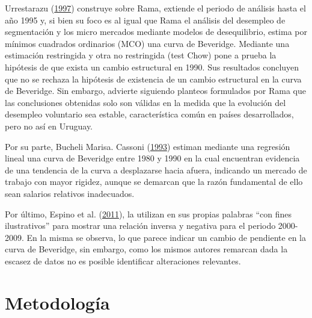 \documentclass[12pt,twoside]{reedthesis}
\begin{document}
Urrestarazu (\protect\hyperlink{ref-Urrestarazu1997}{1997}) construye sobre Rama, extiende el periodo de análisis hasta el año 1995 y, si bien su foco es al igual que Rama el análisis del desempleo de segmentación y los micro mercados mediante modelos de desequilibrio, estima por mínimos cuadrados ordinarios (MCO) una curva de Beveridge. Mediante una estimación restringida y otra no restringida (test Chow) pone a prueba la hipótesis de que exista un cambio estructural en 1990. Sus resultados concluyen que no se rechaza la hipótesis de existencia de un cambio estructural en la curva de Beveridge. Sin embargo, advierte siguiendo planteos formulados por Rama que las conclusiones obtenidas solo son válidas en la medida que la evolución del desempleo voluntario sea estable, característica común en países desarrollados, pero no así en Uruguay.

Por su parte, Bucheli Marisa. Cassoni (\protect\hyperlink{ref-DECON1993}{1993}) estiman mediante una regresión lineal una curva de Beveridge entre 1980 y 1990 en la cual encuentran evidencia de una tendencia de la curva a desplazarse hacia afuera, indicando un mercado de trabajo con mayor rigidez, aunque se demarcan que la razón fundamental de ello sean salarios relativos inadecuados.

Por último, Espino et al. (\protect\hyperlink{ref-Alma2011}{2011}), la utilizan en sus propias palabras ``con fines ilustrativos'' para mostrar una relación inversa y negativa para el periodo 2000-2009. En la misma se observa, lo que parece indicar un cambio de pendiente en la curva de Beveridge, sin embargo, como los mismos autores remarcan dada la escasez de datos no es posible identificar alteraciones relevantes.

\hypertarget{metodologuxeda}{%
\chapter{Metodología}\label{metodologuxeda}}
\end{document}
